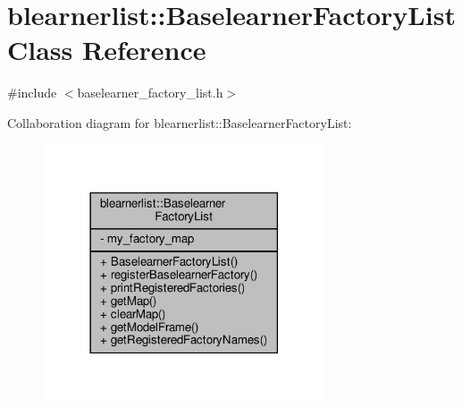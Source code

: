 \hypertarget{classblearnerlist_1_1_baselearner_factory_list}{}\section{blearnerlist\+:\+:Baselearner\+Factory\+List Class Reference}
\label{classblearnerlist_1_1_baselearner_factory_list}


{\ttfamily \#include $<$baselearner\+\_\+factory\+\_\+list.\+h$>$}



Collaboration diagram for blearnerlist\+:\+:Baselearner\+Factory\+List\+:
\nopagebreak
\begin{figure}[H]
\begin{center}
\leavevmode
\includegraphics[width=237pt]{classblearnerlist_1_1_baselearner_factory_list__coll__graph}
\end{center}
\end{figure}
